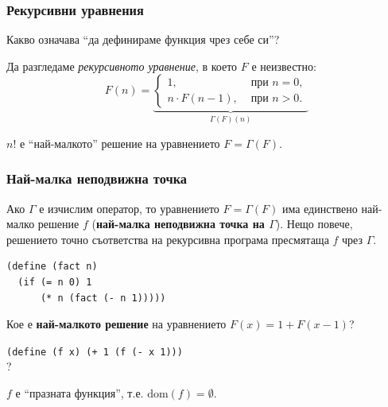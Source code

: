 \documentclass{beamer}
\begin{document}
\begin{frame}
  \frametitle{Рекурсивни уравнения}

  Какво означава ``да дефинираме функция чрез себе си''?
  \vspace{1em}

  \pause

  Да разгледаме \emph{рекурсивното уравнение}, в което $F$ е неизвестно:
  \begin{equation*}
    F(n) =
    \underbrace{\begin{cases}
      1,&\text{ при }n = 0,\\
      n \cdot F(n-1),&\text{ при }n > 0.
    \end{cases}}_{\Gamma(F)(n)}
  \end{equation*}

  \pause
  \alert{$n!$ е ``най-малкото'' решение на уравнението $F = \Gamma(F)$.}
\end{frame}

\begin{frame}[fragile]
  \frametitle{Най-малка неподвижна точка}

  \begin{theorem}
    Ако $\Gamma$ е изчислим оператор, то уравнението $F = \Gamma(F)$ има единствено най-малко решение $f$ \pause (\textbf{най-малка неподвижна точка на $\Gamma$}). \pause Нещо повече, решението точно съответства на рекурсивна програма пресмятаща $f$ чрез $\Gamma$.
  \end{theorem}

  \pause

\begin{verbatim}
(define (fact n)
  (if (= n 0) 1
      (* n (fact (- n 1)))))
\end{verbatim}

  \pause

  Кое е \textbf{най-малкото решение} на уравнението $F(x) = 1 + F(x-1)$?

  \pause

\verb#(define (f x) (+ 1 (f (- x 1)))#\\
?

  \pause

  $f$ е ``празната функция'', т.е. $\mathrm{dom}(f) = \emptyset$.

\end{frame}
\end{document}
